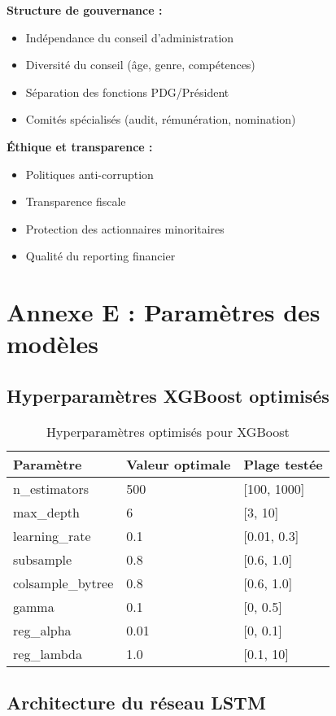 \textbf{Structure de gouvernance :}
\begin{itemize}
\item Indépendance du conseil d'administration
\item Diversité du conseil (âge, genre, compétences)
\item Séparation des fonctions PDG/Président
\item Comités spécialisés (audit, rémunération, nomination)
\end{itemize}

\textbf{Éthique et transparence :}
\begin{itemize}
\item Politiques anti-corruption
\item Transparence fiscale
\item Protection des actionnaires minoritaires
\item Qualité du reporting financier
\end{itemize}

\section{Annexe E : Paramètres des modèles}

\subsection{Hyperparamètres XGBoost optimisés}

\begin{table}[h]
\centering
\begin{tabular}{|l|l|l|}
\hline
\textbf{Paramètre} & \textbf{Valeur optimale} & \textbf{Plage testée} \\
\hline
n\_estimators & 500 & [100, 1000] \\
max\_depth & 6 & [3, 10] \\
learning\_rate & 0.1 & [0.01, 0.3] \\
subsample & 0.8 & [0.6, 1.0] \\
colsample\_bytree & 0.8 & [0.6, 1.0] \\
gamma & 0.1 & [0, 0.5] \\
reg\_alpha & 0.01 & [0, 0.1] \\
reg\_lambda & 1.0 & [0.1, 10] \\
\hline
\end{tabular}
\caption{Hyperparamètres optimisés pour XGBoost}
\end{table}

\subsection{Architecture du réseau LSTM}


